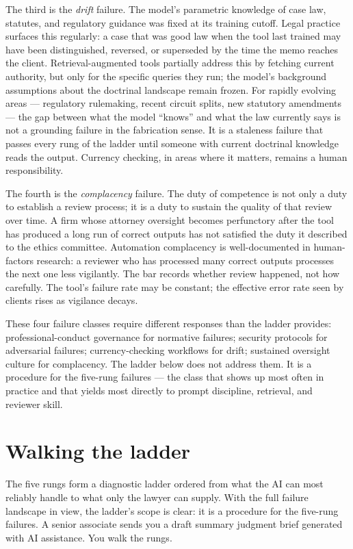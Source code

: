 \documentclass[11pt,a4paper]{article}
\begin{document}
The third is the \emph{drift} failure. The model's parametric
knowledge of case law, statutes, and regulatory guidance was
fixed at its training cutoff. Legal practice surfaces this
regularly: a case that was good law when the tool last trained
may have been distinguished, reversed, or superseded by the time
the memo reaches the client. Retrieval-augmented tools partially
address this by fetching current authority, but only for the
specific queries they run; the model's background assumptions
about the doctrinal landscape remain frozen. For rapidly evolving
areas --- regulatory rulemaking, recent circuit splits, new
statutory amendments --- the gap between what the model ``knows''
and what the law currently says is not a grounding failure in the
fabrication sense. It is a staleness failure that passes every
rung of the ladder until someone with current doctrinal knowledge
reads the output. Currency checking, in areas where it matters,
remains a human responsibility.

The fourth is the \emph{complacency} failure. The duty of
competence is not only a duty to establish a review process; it
is a duty to sustain the quality of that review over time. A
firm whose attorney oversight becomes perfunctory after the tool
has produced a long run of correct outputs has not satisfied the
duty it described to the ethics committee. Automation complacency
is well-documented in human-factors research: a reviewer who has
processed many correct outputs processes the next one less
vigilantly. The bar records whether review happened, not how
carefully. The tool's failure rate may be constant; the effective
error rate seen by clients rises as vigilance decays.

These four failure classes require different responses than the
ladder provides: professional-conduct governance for normative
failures; security protocols for adversarial failures;
currency-checking workflows for drift; sustained oversight
culture for complacency. The ladder below does not address them.
It is a procedure for the five-rung failures --- the class that
shows up most often in practice and that yields most directly to
prompt discipline, retrieval, and reviewer skill.

\section*{Walking the ladder}

The five rungs form a diagnostic ladder ordered from what the AI
can most reliably handle to what only the lawyer can supply.
With the full failure landscape in view, the ladder's scope is
clear: it is a procedure for the five-rung failures. A senior
associate sends you a draft summary judgment brief generated with
AI assistance. You walk the rungs.
\end{document}
